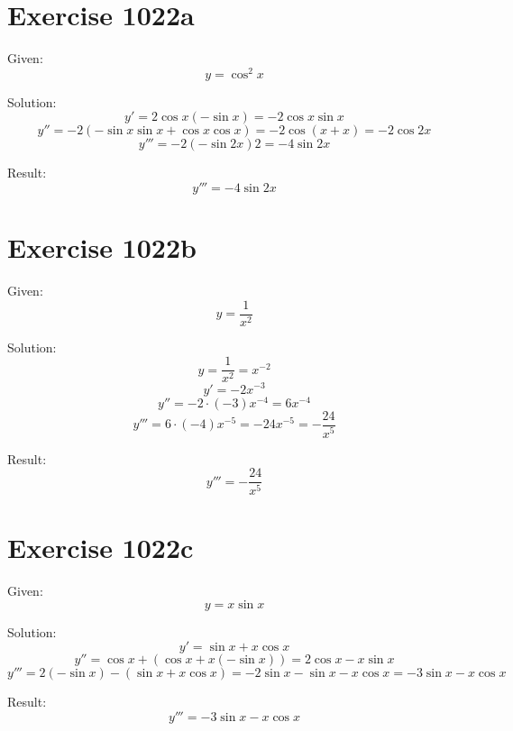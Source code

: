 \documentclass[a4paper, 10pt]{scrartcl}
\begin{document}
\section{Exercise 1022a}

Given:
\[
y = \cos^{2}{x}
\]

Solution:
\[
y' = 2\cos{x}(-\sin{x}) = -2\cos{x}\sin{x}
\]
\[
y'' = -2(-\sin{x}\sin{x} + \cos{x}\cos{x}) = -2\cos{(x + x)} = -2\cos{2x}
\]
\[
y''' = -2(-\sin{2x})2 = -4\sin{2x}
\]

Result:
\[
y''' = -4\sin{2x}
\]

\section{Exercise 1022b}

Given:
\[
y = \frac{1}{x^{2}}
\]

Solution:
\[
y = \frac{1}{x^{2}} = x^{-2}
\]
\[
y' = -2x^{-3}
\]
\[
y'' = -2\cdot (-3)x^{-4} = 6x^{-4}
\]
\[
y''' = 6\cdot (-4)x^{-5} = -24x^{-5} = -\frac{24}{x^{5}}
\]

Result:
\[
y''' = -\frac{24}{x^{5}}
\]

\section{Exercise 1022c}

Given:
\[
y = x\sin{x}
\]

Solution:
\[
y' = \sin{x} + x\cos{x}
\]
\[
y'' = \cos{x} + (\cos{x} + x(-\sin{x})) = 2\cos{x} - x\sin{x}
\]
\[
y''' = 2(-\sin{x}) - (\sin{x} + x\cos{x}) = -2\sin{x} - \sin{x} - x\cos{x} = -3\sin{x} - x\cos{x}
\]

Result:
\[
y''' = -3\sin{x} - x\cos{x}
\]
\end{document}
